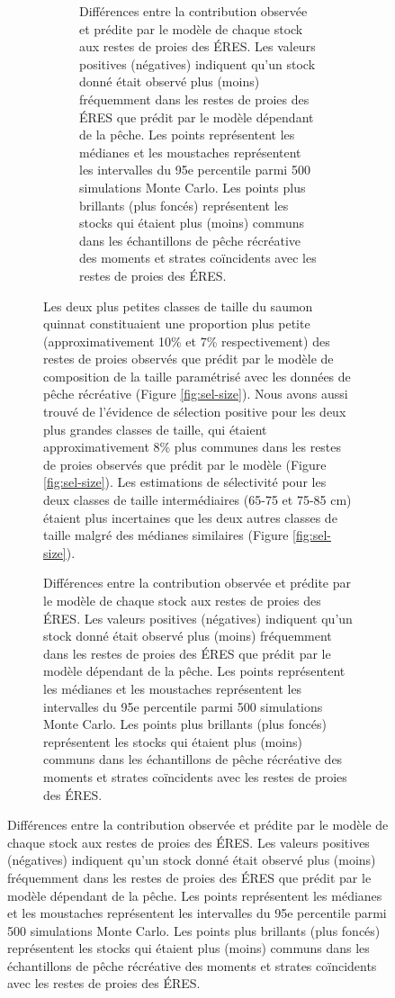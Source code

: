 \begin{figure}[H]
\begin{figure}[H]
\begin{figure}[H]
    \centering
    \caption{Différences entre la contribution observée et prédite par le modèle de chaque stock aux restes de proies des ÉRES. Les valeurs positives (négatives) indiquent qu'un stock donné était observé plus (moins) fréquemment dans les restes de proies des ÉRES que prédit par le modèle dépendant de la pêche. Les points représentent les médianes et les moustaches représentent les intervalles du 95e percentile parmi 500 simulations Monte Carlo. Les points plus brillants (plus foncés) représentent les stocks qui étaient plus (moins) communs dans les échantillons de pêche récréative des moments et strates coïncidents avec les restes de proies des ÉRES.}
    \label{fig:sel-stock}
\end{figure}

Les deux plus petites classes de taille du saumon quinnat constituaient une proportion plus petite (approximativement 10\% et 7\% respectivement) des restes de proies observés que prédit par le modèle de composition de la taille paramétrisé avec les données de pêche récréative (Figure \ref{fig:sel-size}). Nous avons aussi trouvé de l'évidence de sélection positive pour les deux plus grandes classes de taille, qui étaient approximativement 8\% plus communes dans les restes de proies observés que prédit par le modèle (Figure \ref{fig:sel-size}). Les estimations de sélectivité pour les deux classes de taille intermédiaires (65-75 et 75-85 cm) étaient plus incertaines que les deux autres classes de taille malgré des médianes similaires (Figure \ref{fig:sel-size}).


\end{figure}
\end{figure}
